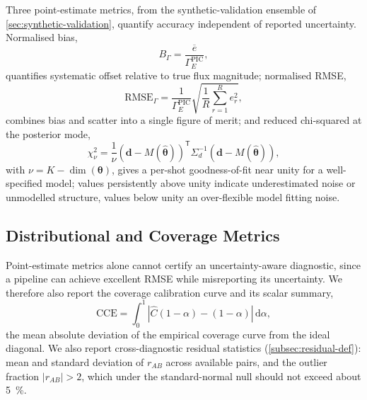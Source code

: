 Three point-estimate metrics, from the synthetic-validation ensemble of \cref{sec:synthetic-validation}, quantify accuracy independent of reported uncertainty. Normalised bias,
\begin{equation}
B_{\Gamma} = \frac{\overline{e}}{\Gamma_{E}^{\text{PIC}}},
\label{eq:norm-bias}
\end{equation}
quantifies systematic offset relative to true flux magnitude; normalised RMSE,
\begin{equation}
\text{RMSE}_{\Gamma} = \frac{1}{\Gamma_{E}^{\text{PIC}}}\sqrt{\frac{1}{R}\sum_{r=1}^{R} e_{r}^{2}},
\label{eq:rmse}
\end{equation}
combines bias and scatter into a single figure of merit; and reduced chi-squared at the posterior mode,
\begin{equation}
\chi_{\nu}^{2} = \frac{1}{\nu} \left(\mathbf{d} - M(\hat{\boldsymbol{\theta}})\right)^{\mathsf{T}} \Sigma_{d}^{-1} \left(\mathbf{d} - M(\hat{\boldsymbol{\theta}})\right),
\label{eq:chi2}
\end{equation}
with $\nu = K - \dim(\boldsymbol{\theta})$, gives a per-shot goodness-of-fit near unity for a well-specified model; values persistently above unity indicate underestimated noise or unmodelled structure, values below unity an over-flexible model fitting noise.

\subsection{Distributional and Coverage Metrics}
\label{subsec:distributional-metrics}

Point-estimate metrics alone cannot certify an uncertainty-aware diagnostic, since a pipeline can achieve excellent RMSE while misreporting its uncertainty. We therefore also report the coverage calibration curve and its scalar summary,
\begin{equation}
\text{CCE} = \int_{0}^{1} \left|\widehat{C}(1-\alpha) - (1-\alpha)\right| \, \mathrm{d}\alpha,
\label{eq:cce}
\end{equation}
the mean absolute deviation of the empirical coverage curve from the ideal diagonal. We also report cross-diagnostic residual statistics (\cref{subsec:residual-def}): mean and standard deviation of $r_{AB}$ across available pairs, and the outlier fraction $|r_{AB}| > 2$, which under the standard-normal null should not exceed about \SI{5}{\percent}.

